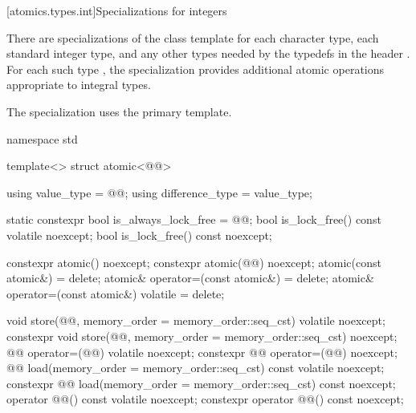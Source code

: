 [atomics.types.int]{Specializations for integers}

%
\pnum
There are specializations of the 
class template for
each character type,
each standard integer type, and
any other types needed by the typedefs in the header .
For each such type , the specialization
 provides additional atomic operations appropriate to integral types.
\begin{note}
The specialization 
uses the primary template.
\end{note}

\begin{codeblock}
namespace std {
  template<> struct atomic<@@> {
    using value_type = @@;
    using difference_type = value_type;

    static constexpr bool is_always_lock_free = @@;
    bool is_lock_free() const volatile noexcept;
    bool is_lock_free() const noexcept;

    constexpr atomic() noexcept;
    constexpr atomic(@@) noexcept;
    atomic(const atomic&) = delete;
    atomic& operator=(const atomic&) = delete;
    atomic& operator=(const atomic&) volatile = delete;

    void store(@@, memory_order = memory_order::seq_cst) volatile noexcept;
    constexpr void store(@@, memory_order = memory_order::seq_cst) noexcept;
    @@ operator=(@@) volatile noexcept;
    constexpr @@ operator=(@@) noexcept;
    @@ load(memory_order = memory_order::seq_cst) const volatile noexcept;
    constexpr @@ load(memory_order = memory_order::seq_cst) const noexcept;
    operator @@() const volatile noexcept;
    constexpr operator @@() const noexcept;

}}
\end{codeblock}

